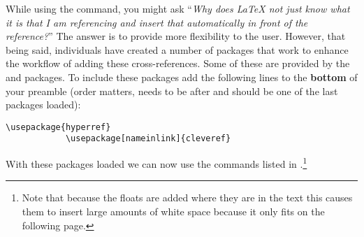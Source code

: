 		While using the  command, you might ask \enquote{\textit{Why does \LaTeX{} not just know what it is that I am referencing and insert that automatically in front of the reference?}}
		The answer is to provide more flexibility to the user.
		However, that being said, individuals have created a number of packages that work to enhance the workflow of adding these cross-references.
		Some of these are provided by the  and  packages.
		To include these packages add the following lines to the \textbf{bottom} of your preamble (order matters,  needs to be after  and  should be one of the last packages loaded):
		\begin{lstlisting}[style=LaTeXStyle]
			\usepackage{hyperref}
			\usepackage[nameinlink]{cleveref}
		\end{lstlisting}
		With these packages loaded we can now use the commands listed in .\footnote{Note that because the floats are added where they are in the text this causes them to insert large amounts of white space because it only fits on the following page.}
